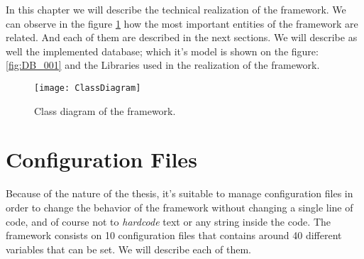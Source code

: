 In this chapter we will describe the technical realization of the framework. We can observe in the figure \ref{fig:ClassDiagram} how the most important entities of the framework are related. And each of them are described in the next sections. We will describe as well the implemented database; which it's model is shown on the figure: \ref{fig:DB_001} and the Libraries used in the realization of the framework.

	\begin{figure}\centering
		\texttt{[image: ClassDiagram]}
		\caption{Class diagram of the framework.}\label{fig:ClassDiagram}
	\end{figure}

\section{Configuration Files}

Because of the nature of the thesis, it's suitable to manage configuration files in order to change the behavior of the framework without changing a single line of code, and of course not to \emph{hardcode} text or any string inside the code. The framework consists on 10 configuration files that contains around 40 different variables that can be set. We will describe each of them.

